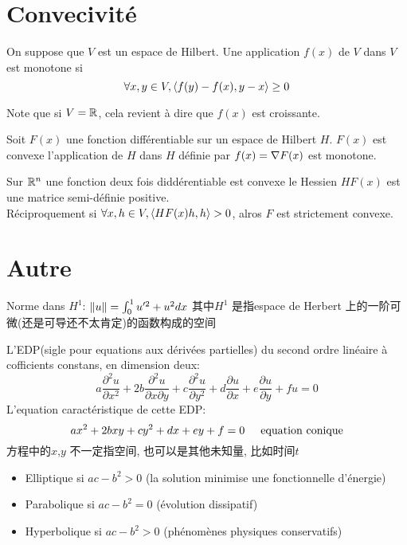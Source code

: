 \documentclass{article}
\begin{document}
\section{Convecivit\'e}
\begin{definition}
		On suppose que $V$ est un espace de Hilbert. Une application $f(x)$ de $V$ dans $V$ est monotone si
		$$
		\forall x,y \in V, \langle f(y)-f(x) , y-x\rangle \geq 0
		$$
\end{definition}
Note que si $V=\mathbb{R}$, cela revient \`a dire que $f(x)$ est croissante.

\begin{theorem}
		Soit $F(x)$ une fonction diff\'erentiable sur un espace de Hilbert $H$. $F(x)$ est convexe \ssi l'application de $H$ dans $H$ d\'efinie par $f(x) = \nabla F(x)$ est monotone.
\end{theorem}

\begin{theorem}
		Sur $\mathbb{R}^n$ une fonction deux fois didd\'erentiable est convexe \ssi le Hessien $HF(x)$ est une matrice semi-d\'efinie positive.\\
		R\'eciproquement si $\forall x,h \in V, \langle HF(x)h , h\rangle>0$, alros $F$ est strictement convexe.
\end{theorem}

\section{Autre}
Norme dans $H^1$: $\left\Vert u\right\Vert = \int_0^1 u'^2 + u^2 dx$\newline
其中$H^1$ 是指espace de Herbert 上的一阶可微(还是可导还不太肯定)的函数构成的空间


L'EDP(sigle pour equations aux d\'eriv\'ees partielles) du second ordre lin\'eaire \`a cofficients constans, en dimension deux:
\begin{equation}
		a \frac{\partial^2 u}{\partial x^2} +
		2b \frac{\partial^2 u}{\partial x \partial y} +
		c \frac{\partial^2 u}{\partial y^2} +
		d \frac{\partial u}{\partial x} +
		e \frac{\partial u}{\partial y} +
		fu
		=0
\end{equation}
L'equation caract\'eristique de cette EDP:
\begin{equation}
		ax^2 + 2bxy + cy^2 + dx + ey + f = 0 \hspace{0.5cm} \text{equation conique}
\end{equation}
方程中的$x$,$y$ 不一定指空间, 也可以是其他未知量, 比如时间$t$

\begin{itemize}
		\item Elliptique si $ac - b^2 > 0$ (la solution minimise une fonctionnelle d'\'energie)
		\item Parabolique si $ac - b^2 = 0$ (\'evolution dissipatif)
		\item Hyperbolique si $ac - b^2 > 0$ (ph\'enom\`enes physiques conservatifs)
\end{itemize}
\end{document}
